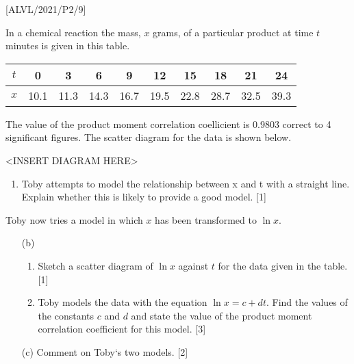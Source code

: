 \item {[}ALVL/2021/P2/9{]}

In a chemical reaction the mass, $x$ grams, of a particular product
at time $t$ minutes is given in this table. 
\begin{center}
\begin{tabular}{|c|c|c|c|c|c|c|c|c|c|}
\hline 
$t$ & 0 & 3 & 6 & 9 & 12 & 15 & 18 & 21 & 24\tabularnewline
\hline 
$x$ & 10.1 & 11.3 & 14.3 & 16.7 & 19.5 & 22.8 & 28.7 & 32.5 & 39.3\tabularnewline
\hline 
\end{tabular}
\par\end{center}

The value of the product moment correlation coellicient is 0.9803
correct to 4 significant figures. The scatter diagram for the data
is shown below.
\noindent \begin{center}
<INSERT DIAGRAM HERE>
\par\end{center}
\begin{enumerate}
\item Toby attempts to model the relationship between x and t with a straight
line. Explain whether this is likely to provide a good model. \hfill{}
{[}1{]}
\end{enumerate}
Toby now tries a model in which $x$ has been transformed to $\ln x$.
\begin{enumerate}
\item[(b)]  {} 
\begin{enumerate}
\item Sketch a scatter diagram of $\ln x$ against $t$ for the data given
in the table. \hfill{}{[}1{]}
\item Toby models the data with the equation $\ln x=c+dt$. Find the values
of the constants $c$ and $d$ and state the value of the product
moment correlation coefficient for this model. \hfill{}{[}3{]}
\end{enumerate}
\item[(c)] Comment on Toby\textquoteleft s two models. \hfill{}{[}2{]}
\end{enumerate}
